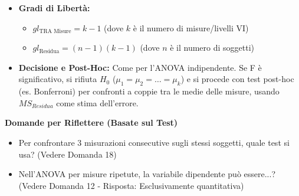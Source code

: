 \documentclass[12pt, a4paper]{article}
\newenvironment{reflectionbox}{%
    \medskip
    \begin{framed}\par\noindent
    \textbf{\color{boxtitlecolor}Domande per Riflettere (Basate sul Test)} \par
    \begin{itemize}[leftmargin=*, label=$\blacktriangleright$]
}{%
    \end{itemize}\par
    \end{framed}
    \medskip
}
\newcommand{\Hnull}{H_0} %
\newcommand{\df}{gl} %
\begin{document}
\begin{itemize}
            \item \textbf{Gradi di Libertà:}
                \begin{itemize}
                    \item $\df_{\text{TRA Misure}} = k - 1$ (dove $k$ è il numero di misure/livelli VI)
                    \item $\df_{\text{Residua}} = (n - 1)(k - 1)$ (dove $n$ è il numero di soggetti)
                \end{itemize}
    \item \textbf{Decisione e Post-Hoc:} Come per l'ANOVA indipendente. Se F è significativo, si rifiuta $\Hnull$ ($\mu_1=\mu_2=\dots=\mu_k$) e si procede con test post-hoc (es. Bonferroni) per confronti a coppie tra le medie delle misure, usando $MS_{Residua}$ come stima dell'errore.
\end{itemize}

\begin{reflectionbox}
    \item Per confrontare 3 misurazioni consecutive sugli stessi soggetti, quale test si usa? (Vedere Domanda 18)
    \item Nell'ANOVA per misure ripetute, la variabile dipendente può essere...? (Vedere Domanda 12 - Risposta: Esclusivamente quantitativa)
\end{reflectionbox}
\end{document}
